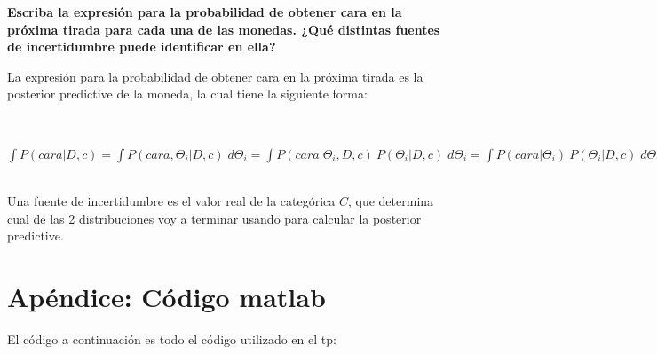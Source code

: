 \textbf{Escriba la expresión para la probabilidad de obtener cara en la próxima tirada para cada una de las monedas. 
¿Qué distintas fuentes de incertidumbre puede identificar en ella?}

La expresión para la probabilidad de obtener cara en la próxima tirada es la posterior predictive de la moneda, la cual tiene la siguiente forma:

~\\
{\Large
${\displaystyle \int} P(cara | D,c) = {\displaystyle \int} P(cara, \Theta_{i} | D, c) \; d\Theta_{i} = {\displaystyle \int} P(cara | \Theta_{i}, D, c) \ P(\Theta_{i} | D, c) \; d\Theta_{i} =
{\displaystyle \int} P(cara | \Theta_{i}) \ P(\Theta_{i} | D, c) \; d\Theta_{i} = {\displaystyle \int} P(cara | \Theta_{i}) \ [ P(\Phi | D) I(c = i) \ + \ P(\Psi | D) I(c \neq i)] \; d\Theta_{i} = 
{\displaystyle \int} P(cara | \Theta_{i}) \ [ P(\Phi) I(c = i) \ + \ P(\Psi) I(c \neq i)] \; d\Theta_{i}$

}

~\\

Una fuente de incertidumbre es el valor real de la categórica $C$, que determina cual de las 2 distribuciones voy a terminar usando para calcular la posterior predictive.

\newpage
\section{Apéndice: Código matlab}

El código a continuación es todo el código utilizado en el tp:

